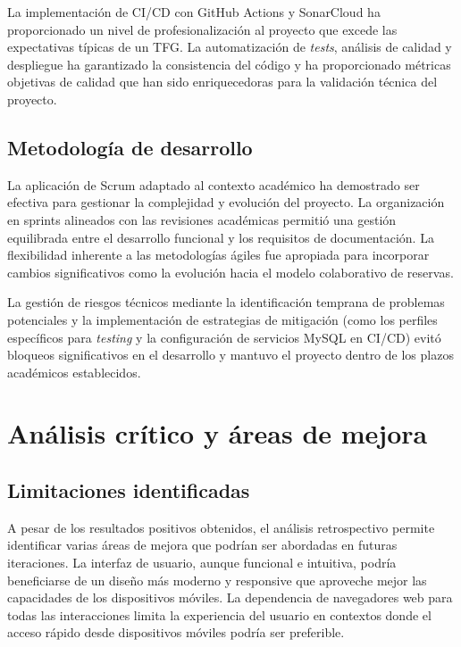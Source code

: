 La implementación de CI/CD con GitHub Actions y SonarCloud ha proporcionado un nivel de profesionalización al proyecto que excede las expectativas típicas de un TFG. La automatización de \emph{tests}, análisis de calidad y despliegue ha garantizado la consistencia del código y ha proporcionado métricas objetivas de calidad que han sido enriquecedoras para la validación técnica del proyecto.

\subsection{Metodología de desarrollo}\label{metodologias-desarrollo}
La aplicación de Scrum adaptado al contexto académico ha demostrado ser efectiva para gestionar la complejidad y evolución del proyecto. La organización en sprints alineados con las revisiones académicas permitió una gestión equilibrada entre el desarrollo funcional y los requisitos de documentación. La flexibilidad inherente a las metodologías ágiles fue apropiada para incorporar cambios significativos como la evolución hacia el modelo colaborativo de reservas.

La gestión de riesgos técnicos mediante la identificación temprana de problemas potenciales y la implementación de estrategias de mitigación (como los perfiles específicos para \emph{testing} y la configuración de servicios MySQL en CI/CD) evitó bloqueos significativos en el desarrollo y mantuvo el proyecto dentro de los plazos académicos establecidos.

\section{Análisis crítico y áreas de mejora}\label{analisis-critico-areas-mejora}
\subsection{Limitaciones identificadas}\label{limitaciones-identificadas}
A pesar de los resultados positivos obtenidos, el análisis retrospectivo permite identificar varias áreas de mejora que podrían ser abordadas en futuras iteraciones. La interfaz de usuario, aunque funcional e intuitiva, podría beneficiarse de un diseño más moderno y responsive que aproveche mejor las capacidades de los dispositivos móviles. La dependencia de navegadores web para todas las interacciones limita la experiencia del usuario en contextos donde el acceso rápido desde dispositivos móviles podría ser preferible.

